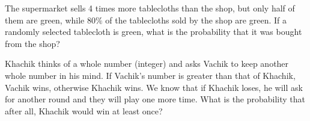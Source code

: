 \begin{problem}
The supermarket sells 4 times more tablecloths than the shop, but only half of them are green, while $80\%$ of the tablecloths sold by the shop are green. If a randomly selected tablecloth is green, what is the probability that it was bought from the shop?
\end{problem}
\medskip


\begin{problem}
Khachik thinks of a whole number (integer) and asks Vachik to keep another whole number in his mind. If Vachik's number is greater than that of Khachik, Vachik wins, otherwise Khachik wins. We know that if Khachik loses, he will ask for another round and they will play one more time. What is the probability that after all, Khachik would win at least once?
\end{problem}
\medskip